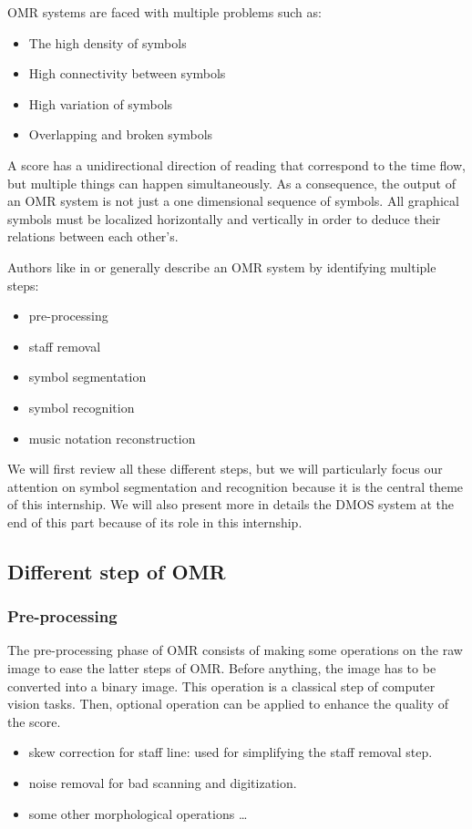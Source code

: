 \documentclass[11pt]{sdm}
\begin{document}
OMR systems are faced with multiple problems such as:
\begin{itemize}
  \item The high density of symbols
  \item High connectivity between symbols
  \item High variation of symbols
  \item Overlapping and broken symbols
\end{itemize}
A score has a unidirectional direction of reading that correspond to the time flow, but multiple things can happen simultaneously.
As a consequence, the output of an OMR system is not just a one dimensional sequence of symbols.
All graphical symbols must be localized horizontally and vertically in order to deduce their relations between each other’s.

Authors like in \cite{rebelo_optical_2012} or \cite{fornes_analysis_2014} generally describe an OMR system by identifying multiple steps:
\begin{itemize}
  \item pre-processing
  \item staff removal
  \item symbol segmentation
  \item symbol recognition
  \item music notation reconstruction
\end{itemize}
We will first review all these different steps, but we will particularly focus our attention on symbol segmentation and recognition because it is the central theme of this internship.
We will also present more in details the DMOS system at the end of this part because of its role in this internship.

\subsection{Different step of OMR}

\subsubsection{Pre-processing}

The pre-processing phase of OMR consists of making some operations on the raw image to ease the latter steps of OMR.
Before anything, the image has to be converted into a binary image.
This operation is a classical step of computer vision tasks.
Then, optional operation can be applied to enhance the quality of the score.
\begin{itemize}
  \item skew correction for staff line: used for simplifying the staff removal step.
  \item noise removal for bad scanning and digitization.
  \item some other morphological operations \ldots
\end{itemize}
\end{document}
